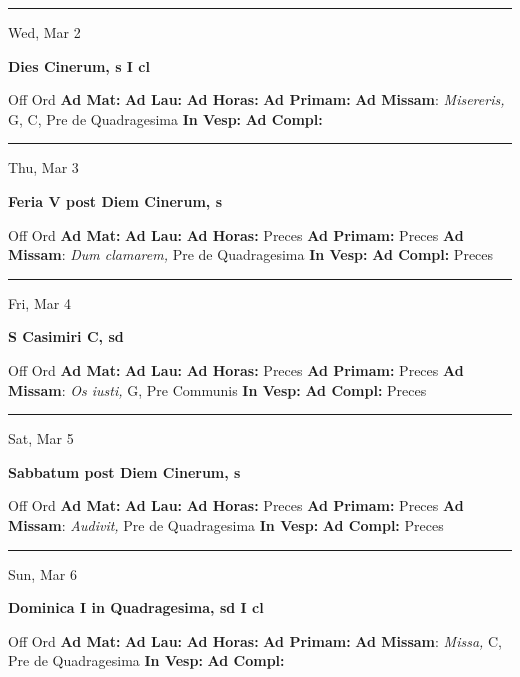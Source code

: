 \documentclass[letterpaper, 10pt]{article}
\begin{document}
\hrule
\begin{center}
Wed, Mar 2
\end{center}\textbf{ \large Dies Cinerum, \textnormal{\normalsize s I cl}}
\begin{justify}
Off Ord
\textbf{Ad Mat: }
\textbf{Ad Lau: }
\textbf{Ad Horas: }
\textbf{Ad Primam: }
\textbf{Ad Missam}: \textit{Misereris,} G, C, Pre de Quadragesima
\textbf{In Vesp: }
\textbf{Ad Compl: }\end{justify}



\hrule
\begin{center}
Thu, Mar 3
\end{center}\textbf{ \large Feria V post Diem Cinerum, \textnormal{\normalsize s}}
\begin{justify}
Off Ord
\textbf{Ad Mat: }
\textbf{Ad Lau: }
\textbf{Ad Horas: }Preces
\textbf{Ad Primam: }Preces
\textbf{Ad Missam}: \textit{Dum clamarem,} Pre de Quadragesima
\textbf{In Vesp: }
\textbf{Ad Compl: }Preces\end{justify}



\hrule
\begin{center}
Fri, Mar 4
\end{center}\textbf{ \large S Casimiri C, \textnormal{\normalsize sd}}
\begin{justify}
Off Ord
\textbf{Ad Mat: }
\textbf{Ad Lau: }
\textbf{Ad Horas: }Preces
\textbf{Ad Primam: }Preces
\textbf{Ad Missam}: \textit{Os iusti,} G, Pre Communis
\textbf{In Vesp: }
\textbf{Ad Compl: }Preces\end{justify}



\hrule
\begin{center}
Sat, Mar 5
\end{center}\textbf{ \large Sabbatum post Diem Cinerum, \textnormal{\normalsize s}}
\begin{justify}
Off Ord
\textbf{Ad Mat: }
\textbf{Ad Lau: }
\textbf{Ad Horas: }Preces
\textbf{Ad Primam: }Preces
\textbf{Ad Missam}: \textit{Audivit,} Pre de Quadragesima
\textbf{In Vesp: }
\textbf{Ad Compl: }Preces\end{justify}



\hrule
\begin{center}
Sun, Mar 6
\end{center}\textbf{ \large Dominica I in Quadragesima, \textnormal{\normalsize sd I cl}}
\begin{justify}
Off Ord
\textbf{Ad Mat: }
\textbf{Ad Lau: }
\textbf{Ad Horas: }
\textbf{Ad Primam: }
\textbf{Ad Missam}: \textit{Missa,} C, Pre de Quadragesima
\textbf{In Vesp: }
\textbf{Ad Compl: }\end{justify}
\end{document}
